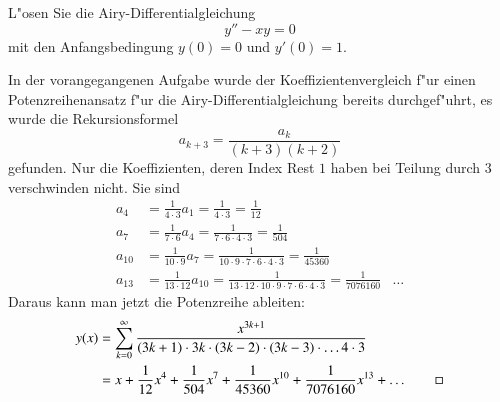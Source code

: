 L"osen Sie die Airy-Differentialgleichung
\[
y''-xy=0
\]
mit den Anfangsbedingung $y(0)=0$ und $y'(0)=1$.
%

\begin{loesung}
In der vorangegangenen Aufgabe wurde der Koeffizientenvergleich f"ur einen
Potenzreihenansatz f"ur die Airy-Differentialgleichung bereits durchgef"uhrt,
es wurde die Rekursionsformel
\[
a_{k+3}=\frac{a_k}{(k+3)(k+2)}
\]
gefunden.
Nur die Koeffizienten, deren Index Rest $1$ haben bei Teilung durch $3$
verschwinden nicht.
Sie sind
\begin{align*}
a_4&=\frac1{4\cdot 3}a_1=\frac1{4\cdot 3}=\frac1{12}
\\
a_7&=\frac1{7\cdot 6}a_4=\frac1{7\cdot 6\cdot 4\cdot 3}=\frac1{504}
\\
a_{10}&=\frac1{10\cdot 9}a_7
=
\frac1{10\cdot 9\cdot 7\cdot 6\cdot 4\cdot 3}=\frac1{45360}
\\
a_{13}&=\frac1{13\cdot 12}a_{10}=
\frac1{13\cdot 12\cdot 10\cdot 9\cdot 7\cdot 6\cdot 4\cdot 3}=\frac1{7076160}
&\dots
\end{align*}
Daraus kann man jetzt die Potenzreihe ableiten:
\begin{align*}
y(x)
&=
\sum_{k=0}^\infty \frac{x^{3k+1}}{(3k+1)\cdot3k\cdot (3k-2)\cdot(3k-3)\cdot \dots 4\cdot 3}
\\
&=
x + \frac1{12}x^4+\frac1{504}x^7+\frac1{45360}x^{10}+\frac1{7076160}x^{13}+\dots
\qedhere
\end{align*}
\end{loesung}

